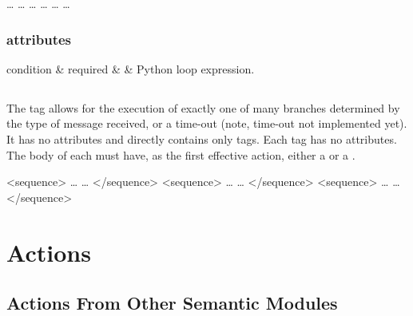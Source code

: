 \begin{codelisting}
        \dots
        \dots
        \dots
        \dots
        \dots
        \dots
\end{codelisting}

\subsubsection{ attributes}

\begin{attrDefs}
condition	&	required	&			& Python loop expression. \\
\end{attrDefs}

\subsection{}

The  tag allows for the execution of exactly one
of many branches determined by the type of message received,
or a time-out (note, time-out not implemented yet).  It has
no attributes and directly contains only  tags.
Each  tag has no attributes.  The body of each
 must have, as the first effective action, 
either a  or a .

\begin{codelisting}
        <sequence>
            \dots
            \dots
        </sequence>
        <sequence>
            \dots
            \dots
        </sequence>
        <sequence>
            \dots
            \dots
        </sequence>
\end{codelisting}



\section{Actions}

\subsection{}

\subsection{Actions From Other Semantic Modules}





